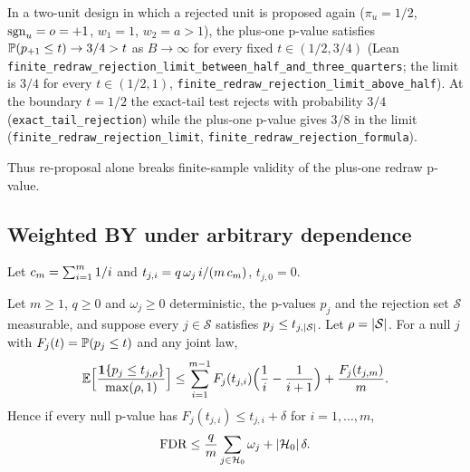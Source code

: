 \begin{proposition}
In a two-unit design in which a rejected unit is proposed again ($\pi_u = 1/2$, $\mathrm{sgn}_u = o = +1$, $w_1 = 1$, $w_2 = a > 1$), the plus-one p-value satisfies $\mathbb{P}(p_{+1} \le t) \to 3/4 > t$ as $B \to \infty$ for every fixed $t \in (1/2, 3/4)$ (Lean \texttt{finite\_redraw\_rejection\_limit\_between\_half\_and\_three\_quarters}; the limit is $3/4$ for every $t \in (1/2, 1)$, \texttt{finite\_redraw\_rejection\_limit\_above\_half}). At the boundary $t = 1/2$ the exact-tail test rejects with probability $3/4$ (\texttt{exact\_tail\_rejection}) while the plus-one p-value gives $3/8$ in the limit (\texttt{finite\_redraw\_rejection\_limit}, \texttt{finite\_redraw\_rejection\_formula}).
\end{proposition}

\noindent Thus re-proposal alone breaks finite-sample validity of the plus-one redraw p-value.


\subsection{Weighted BY under arbitrary dependence}
\label{spec:thm.byfin}

Let $c_m = \sum_{i=1}^m 1/i$ and $t_{j,i} = q\,\omega_j\, i/(m\,c_m)$, $t_{j,0} = 0$.

\begin{theorem}
Let $m \ge 1$, $q \ge 0$ and $\omega_j \ge 0$ deterministic, the p-values $p_j$ and the rejection set $\mathcal{S}$ measurable, and suppose every $j \in \mathcal{S}$ satisfies $p_j \le t_{j,\lvert \mathcal{S}\rvert}$. Let $\rho = \lvert \mathcal{S}\rvert$. For a null $j$ with $F_j(t) = \mathbb{P}(p_j \le t)$ and any joint law,
\begin{equation*}
\mathbb{E}\Bigl[\frac{\mathbf{1}\{p_j \le t_{j,\rho}\}}{\max(\rho, 1)}\Bigr]
\le \sum_{i=1}^{m-1} F_j(t_{j,i}) \Bigl(\frac{1}{i} - \frac{1}{i+1}\Bigr) + \frac{F_j(t_{j,m})}{m}.
\end{equation*}
Hence if every null p-value has $F_j(t_{j,i}) \le t_{j,i} + \delta$ for $i = 1, \dots, m$,
\begin{equation*}
\mathrm{FDR} \le \frac{q}{m}\sum_{j \in \mathcal{H}_0} \omega_j + \lvert \mathcal{H}_0\rvert\,\delta .
\end{equation*}
\end{theorem}

